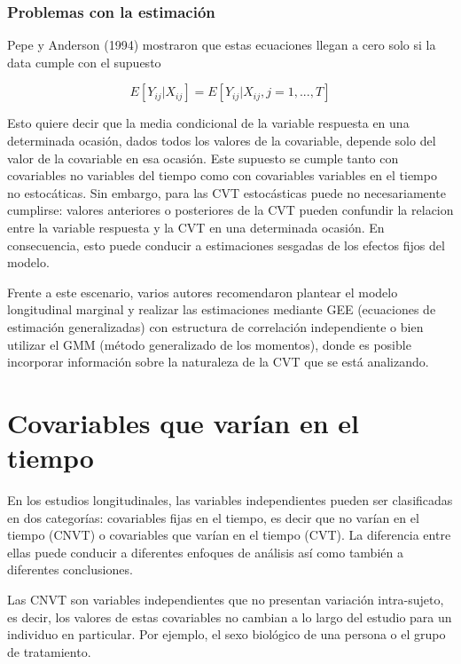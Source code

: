 \documentclass[spanish]{article}
\numberwithin{figure}{subsection}
\numberwithin{equation}{subsection}
\numberwithin{table}{subsection}
\begin{document}
\subsubsection{Problemas con la estimación}

Pepe y Anderson (1994) mostraron que estas ecuaciones llegan a cero solo si la
data cumple con el supuesto

\begin{equation}
\label{estimation_issue}
	E[Y_{ij} | X_{ij}] = E[Y_{ij} | X_{ij}, j = 1, ..., T]
\end{equation}

Esto quiere decir que la media condicional de la variable respuesta en una
determinada ocasión, dados todos los valores de la covariable, depende solo del
valor de la covariable en esa ocasión. Este supuesto se cumple tanto con
covariables no variables del tiempo como con covariables variables en el tiempo
no estocáticas. Sin embargo, para las CVT estocásticas puede no necesariamente
cumplirse: valores anteriores o posteriores de la CVT pueden confundir la
relacion entre la variable respuesta y la CVT en una determinada ocasión. En
consecuencia, esto puede conducir a estimaciones sesgadas de los efectos fijos
del modelo.

Frente a este escenario, varios autores recomendaron plantear el modelo
longitudinal marginal y realizar las estimaciones mediante GEE (ecuaciones de
estimación generalizadas) con estructura de correlación independiente o bien
utilizar el GMM (método generalizado de los momentos), donde es posible
incorporar información sobre la naturaleza de la CVT que se está analizando.

\newpage

\section{Covariables que varían en el tiempo}

En los estudios longitudinales, las variables independientes pueden ser
clasificadas en dos categorías: covariables fijas en el tiempo, es decir que no
varían en el tiempo (CNVT) o covariables que varían en el tiempo (CVT). La
diferencia entre ellas puede conducir a diferentes enfoques de análisis así
como también a diferentes conclusiones.

Las CNVT son variables independientes que no presentan variación intra-sujeto,
es decir, los valores de estas covariables no cambian a lo largo del estudio
para un individuo en particular. Por ejemplo, el sexo biológico de una persona
o el grupo de tratamiento.
\end{document}
